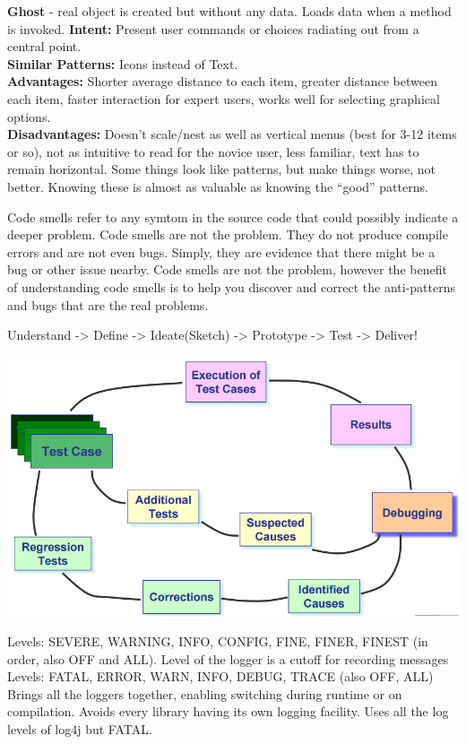 \documentclass[number]{assignment}
\begin{document}
\begin{landscape}
\begin{multicols}{3}
\textbf{Ghost} - real object is created but without any data. Loads data when a method is invoked.
\textbf{Intent:} Present user commands or choices radiating out from a central point.\\
\textbf{Similar Patterns:} Icons instead of Text.\\
\textbf{Advantages:} Shorter average distance to each item, greater distance between each item, faster interaction for expert users, works well for selecting graphical options.\\
\textbf{Disadvantages:} Doesn't scale/nest as well as vertical menus (best for 3-12 items or so), not as intuitive to read for the novice user, less familiar, text has to remain horizontal.
Some things look like patterns, but make things worse, not better. Knowing these is almost as valuable as knowing the ``good'' patterns.

Code smells refer to any symtom in the source code that could possibly indicate a deeper problem. Code smells are not the problem. They do not produce compile errors and are not even bugs. Simply, they are evidence that there might be a bug or other issue nearby.
Code smells are not the problem, however the benefit of understanding code smells is to help you discover and correct the anti-patterns and bugs that are the real problems.

Understand -> Define -> Ideate(Sketch) -> Prototype -> Test -> Deliver!

\includegraphics[width=\linewidth]{DebugProcess.png}

Levels: SEVERE, WARNING, INFO, CONFIG, FINE, FINER, FINEST (in order, also OFF and ALL). Level of the logger is a cutoff for recording messages
Levels: FATAL, ERROR, WARN, INFO, DEBUG, TRACE (also OFF, ALL)
Brings all the loggers together, enabling switching during runtime or on compilation. Avoids every library having its own logging facility. Uses all the log levels of log4j but FATAL.


\end{multicols}
\end{landscape}
\end{document}
